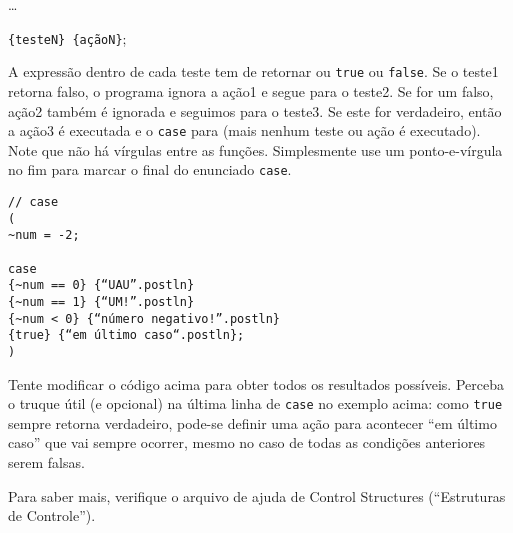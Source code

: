 \dots

\texttt{\{testeN\} \{açãoN\}};

A expressão dentro de cada teste tem de retornar ou \texttt{true} ou \texttt{false}. Se o teste1 retorna falso, o programa ignora a ação1 e segue para o teste2. Se for um falso, ação2 também é ignorada e seguimos para o teste3. Se este for verdadeiro, então a ação3 é executada e o \texttt{case} para (mais nenhum teste ou ação é executado). Note que não há vírgulas entre as funções. Simplesmente use um ponto-e-vírgula no fim para marcar o final do enunciado \texttt{case}.

 
\begin{lstlisting}[style=SuperCollider-IDE, basicstyle=\scttfamily\footnotesize]
// case
(
~num = -2;

case
{~num == 0} {“UAU”.postln}
{~num == 1} {“UM!”.postln}
{~num < 0} {“número negativo!”.postln}
{true} {“em último caso“.postln};
)
\end{lstlisting}
 
Tente modificar o código acima para obter todos os resultados possíveis. Perceba o truque útil (e opcional) na última linha de \texttt{case} no exemplo acima: como \texttt{true} sempre retorna verdadeiro, pode-se definir uma ação para acontecer “em último caso” que vai sempre ocorrer, mesmo no caso de todas as condições anteriores serem falsas.

Para saber mais, verifique o arquivo de ajuda de Control Structures (“Estruturas de Controle”).
